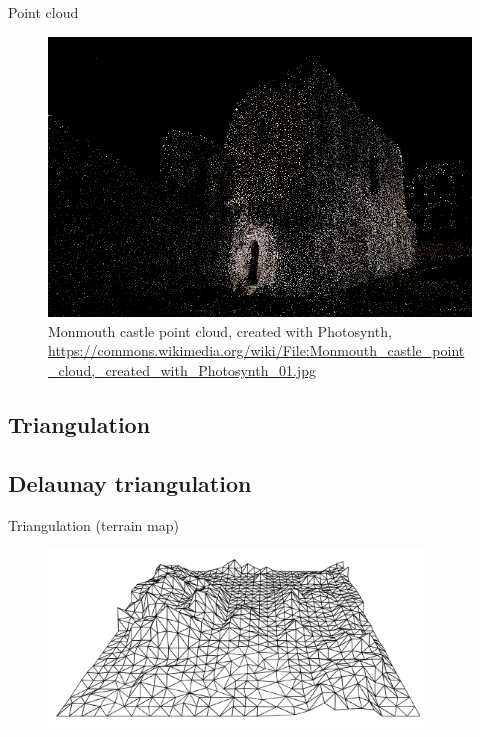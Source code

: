\begin{frame}{Point cloud}
\begin{figure}
    \centering
    \includegraphics[width=\textwidth]{figs/Monmouth_castle_point_cloud,_created_with_Photosynth_01.jpg}
    \caption{Monmouth castle point cloud, created with Photosynth, \url{https://commons.wikimedia.org/wiki/File:Monmouth_castle_point_cloud,_created_with_Photosynth_01.jpg}}
    \label{fig:my_label}
\end{figure}
    
\end{frame}


\subsection{Triangulation}
\subsection{Delaunay triangulation}
\begin{frame}{Triangulation (terrain map)}
\begin{figure}
    \centering
    \includegraphics[width=0.9\textwidth]{figs/L07-terrain-map.png}
\end{figure}

\end{frame}



